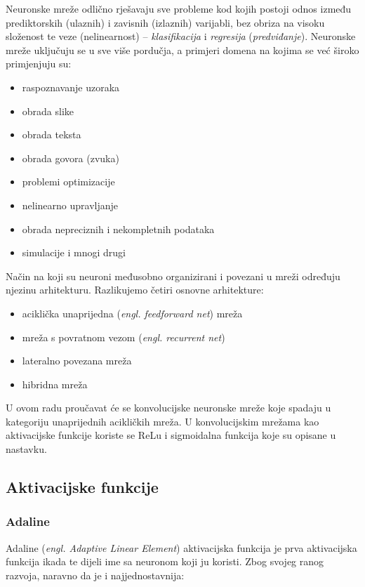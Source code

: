 Neuronske mreže odlično rješavaju sve probleme kod kojih postoji odnos između prediktorskih (ulaznih) i zavisnih (izlaznih) varijabli, bez obriza na visoku složenost te veze (nelinearnost) -- \textit{klasifikacija} i \textit{regresija} (\textit{predviđanje}). Neuronske mreže uključuju se u sve više pordučja, a primjeri domena na kojima se već široko primjenjuju su:

\begin{itemize}
\item raspoznavanje uzoraka
\item obrada slike
\item obrada teksta
\item obrada govora (zvuka)
\item problemi optimizacije
\item nelinearno upravljanje
\item obrada nepreciznih i nekompletnih podataka
\item simulacije i mnogi drugi
\end{itemize}

Način na koji su neuroni međusobno organizirani i povezani u mreži određuju njezinu
arhitekturu. Razlikujemo četiri osnovne arhitekture:

\begin{itemize}
\item aciklička unaprijedna (\textit{engl. feedforward net}) mreža
\item mreža s povratnom vezom (\textit{engl. recurrent net})
\item lateralno povezana mreža
\item hibridna mreža
\end{itemize}

U ovom radu proučavat će se konvolucijske neuronske mreže koje spadaju u kategoriju unaprijednih acikličkih mreža. U konvolucijskim mrežama kao aktivacijske funkcije koriste se ReLu i sigmoidalna funkcija koje su opisane u nastavku.


\subsection{Aktivacijske funkcije}

\subsubsection{Adaline}

Adaline (\textit{engl. Adaptive Linear Element}) aktivacijska funkcija je prva aktivacijska funkcija ikada te dijeli ime sa neuronom koji ju koristi. Zbog svojeg ranog razvoja, naravno da je i najjednostavnija:

